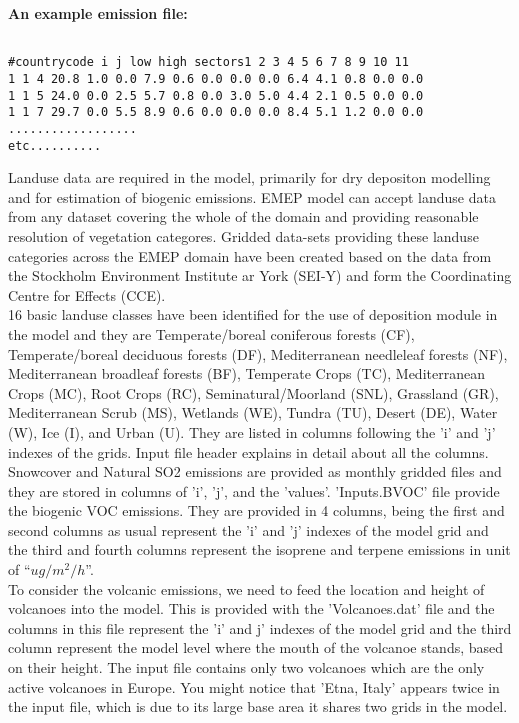 \textbf{An example emission file:}

\begin{verbatim}

#countrycode i j low high sectors1 2 3 4 5 6 7 8 9 10 11 
1 1 4 20.8 1.0 0.0 7.9 0.6 0.0 0.0 0.0 6.4 4.1 0.8 0.0 0.0
1 1 5 24.0 0.0 2.5 5.7 0.8 0.0 3.0 5.0 4.4 2.1 0.5 0.0 0.0
1 1 7 29.7 0.0 5.5 8.9 0.6 0.0 0.0 0.0 8.4 5.1 1.2 0.0 0.0
..................
etc..........

\end{verbatim}

Landuse data are required in the model, primarily for dry
depositon modelling and for estimation of biogenic emissions.  EMEP
model can accept landuse data from any dataset covering the whole of
the domain and providing reasonable resolution of vegetation
categores.  Gridded data-sets providing these landuse categories
across the EMEP domain have been created based on the data from the
Stockholm Environment Institute ar York (SEI-Y) and form the
Coordinating Centre for Effects (CCE).\\

 16 basic landuse classes have
been identified for the use of deposition module in the model and they
are Temperate/boreal coniferous forests (CF), Temperate/boreal
deciduous forests (DF), Mediterranean needleleaf forests (NF),
Mediterranean broadleaf forests (BF), Temperate Crops (TC),
Mediterranean Crops (MC), Root Crops (RC), Seminatural/Moorland (SNL),
Grassland (GR), Mediterranean Scrub (MS), Wetlands (WE), Tundra (TU),
Desert (DE), Water (W), Ice (I), and Urban (U).  They are listed in
columns following the 'i' and 'j' indexes of the
grids. Input file header explains in detail about all the
columns. \\

Snowcover and Natural SO2 emissions are provided as monthly gridded
files and they are stored in columns of 'i', 'j', and the
'values'. 'Inputs.BVOC' file provide the biogenic VOC emissions.  They
are provided in 4 columns, being the first and second columns as usual
represent the 'i' and 'j' indexes of the model grid and the third and
fourth columns represent the isoprene and terpene emissions in unit of
``$ug/m^{2}/h$''.\\
 

To consider the volcanic emissions, we need to feed the location and
height of volcanoes into the model.  This is provided with the
'Volcanoes.dat' file and the columns in this file represent the 'i'
and j' indexes of the model grid and the third column represent the
model level where the mouth of the volcanoe stands, based on their
height.  The input file contains only two volcanoes which are the only
active volcanoes in Europe.  You might notice that 'Etna, Italy'
appears twice in the input file, which is due to its large base area
it shares two grids in the model.  \\
     

